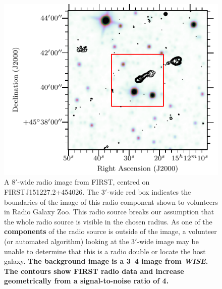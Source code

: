\documentclass[fleqn,usenatbib,usedcolumn]{mnras}
\newcommand{\edited}[1]{{\bf {#1}}}
\begin{document}
    \begin{figure}
      \centering
      \includegraphics[width=\linewidth]{images/FIRSTJ151227_fig.pdf}
      \caption{A $8'$-wide radio image from FIRST, centred on
        FIRSTJ151227.2+454026. The $3'$-wide red box indicates the boundaries of
        the image of this radio component shown to volunteers in Radio Galaxy
        Zoo. This radio source breaks our assumption that the whole radio source
        is visible in the chosen radius. As one of the \edited{components} of the radio source
        is outside of the image, a volunteer (or automated algorithm) looking at
        the $3'$-wide image may be unable to determine that this is a radio
        double or locate the host galaxy. \edited{The background image
        is a \unit{3.4}{\micro\meter} image from \emph{WISE}. The contours show FIRST radio
        data and increase geometrically from a signal-to-noise ratio of 4.}}
      \label{fig:broken-contains}
    \end{figure}
\end{document}
